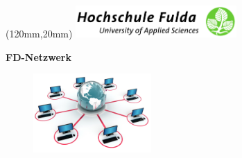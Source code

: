 \documentclass[a4paper,11pt]{article}
\begin{document}
\begin{titlepage}

\begin{textblock*}{70mm}(120mm,20mm)
    \includegraphics[width=232px,height=46px]{HSFuldaLogo.pdf}
    \end{textblock*}

    \begin{center}
    \huge \textbf{\textsf{FD-Netzwerk}} \\
    \vspace{0.5cm}

\begin{figure}[H]
\centering
\includegraphics[width=0.4\textwidth]{network.jpg}
\end{figure}
$~~$\\



\end{center}
\end{titlepage}
\end{document}
